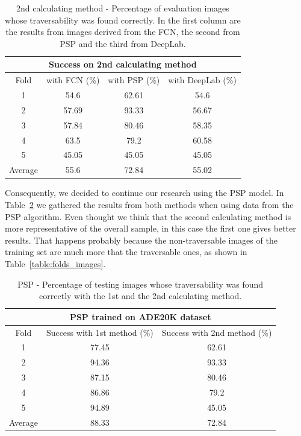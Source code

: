 \documentclass[12pt,a4paper,table,dvipsnames,tikz]{report}
\newcommand{\acronym}{\MakeUppercase}
\newcommand{\bl}[1]{{\hypersetup{linkcolor=blue}#1}}
\begin{document}
	\begin{table}[h!]
		\centering
		\begin{tabular}{|c|c|c|c|}
			\hline
			\multicolumn{4}{|c|}{Success on 2nd calculating method}\\
			\hline
			Fold & with \acronym{fcn} (\%) & with \acronym{psp} (\%) & with DeepLab (\%)\\ 
			\hline\hline
			1 & 54.6 & 62.61 & 54.6\\
			\hline
			2 & 57.69 & 93.33 & 56.67\\
			\hline
			3 & 57.84 & 80.46 & 58.35\\
			\hline
			4 & 63.5 & 79.2 & 60.58\\
			\hline
			5 & 45.05 & 45.05 & 45.05\\
			\hline\hline
			Average & 55.6 & 72.84 & 55.02\\
			\hline
		\end{tabular}
		\caption{2nd calculating method - Percentage of evaluation images whose 
		traversability was found correctly. In the first column are the results from 
		images derived from the \acronym{fcn}, the second from \acronym{psp} and the 
		third from DeepLab.}
		\label{table:2nd}
	\end{table}
	
	Consequently, we decided to continue our research using the \acronym{psp} model. 
	In Table~\bl{\ref{table:psp}} we gathered the results from both methods when using data 
	from the \acronym{psp} algorithm. Even thought we think that the second calculating 
	method is more representative of the overall sample, in this case the first one gives 
	better results. That happens probably because the non-traversable images of the 
	training set are much more that the traversable ones, as shown in 
	Table~\bl{\ref{table:folds_images}}.
	\\
	
	\begin{table}[h!]
		\centering
		\begin{tabular}{|c|c|c|}
			\hline
			\multicolumn{3}{|c|}{\acronym{psp} trained on \acronym{ade20k} dataset}\\
			\hline
			Fold & Success with 1st method (\%) & Success with 2nd method (\%)\\ 
			\hline\hline
			1 & 77.45 & 62.61\\
			\hline
			2 & 94.36 & 93.33\\
			\hline
			3 & 87.15 & 80.46\\
			\hline
			4 & 86.86 & 79.2\\
			\hline
			5 & 94.89 & 45.05\\
			\hline\hline
			Average & 88.33 & 72.84\\
			\hline
		\end{tabular}
		\caption{\acronym{psp} - Percentage of testing images whose	traversability 
			was found correctly with the 1st and the 2nd calculating 
		method.}
		\label{table:psp}
	\end{table}
	
\end{document}
